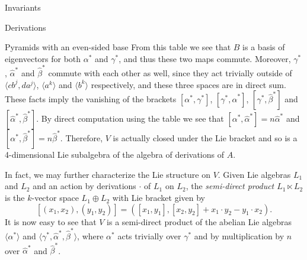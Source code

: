 \begin{chapter}{Invariants}
\begin{section}{Derivations}
\begin{subsection}{Pyramids with an even-sided base}
From this table we see that $B$ is a basis of eigenvectors for both $\alpha^*$ and $\gamma^*$, and thus these two maps commute. Moreover, $\gamma^*$, $\hat\alpha^*$ and $\hat\beta^*$ commute with each other as well, since they act trivially outside of $\langle cb^j, da^j\rangle$, $\langle a^k\rangle$ and $\langle b^k\rangle$ respectively, and these three spaces are in direct sum. These facts imply the vanishing of the brackets $[\alpha^*,\gamma^*]$,  $[\gamma^*, \hat\alpha^*]$, $[\gamma^*, \hat\beta^*]$ and $[\hat\alpha^*, \hat\beta^*]$. By direct computation  using the table we see that $[\alpha^*,\hat\alpha^*]=n\hat\alpha^*$ and $[\alpha^*,\hat\beta^*]=n\hat\beta^*$. Therefore, $V$ is actually closed under the Lie bracket and so is a 4-dimensional Lie subalgebra of the algebra of derivations of $A$.

In fact, we may further characterize the Lie structure on $V$. Given Lie algebras $L_1$ and $L_2$ and an action by derivations $\cdot$ of $L_1$ on $L_2$, the \emph{semi-direct product $L_1\ltimes L_2$} is the $k$-vector space $L_1 \oplus L_2$ with Lie bracket given by
\[[(x_1,x_2), (y_1,y_2)] = ([x_1,y_1], [x_2,y_2]+x_1\cdot y_2 - y_1\cdot x_2).\]
It is now easy to see that $V$ is a semi-direct product of the abelian Lie algebras $\langle \alpha^*\rangle$ and $\langle \gamma^*, \hat\alpha^*, \hat\beta^*\rangle$, where $\alpha^*$ acts trivially over $\gamma^*$ and by multiplication by $n$ over $\hat\alpha^*$ and $\hat\beta^*$.
\end{subsection}
\end{section}
\end{chapter}